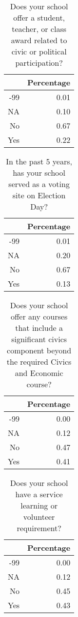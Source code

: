 \documentclass[12pt]{article}
\begin{document}
\begin{table}[ht]
\caption {Does your school offer a student, teacher, or class award related to civic or political participation?}
\centering
\begin{tabular}{rr}
  \hline
 & Percentage \\ 
  \hline
-99 & 0.01 \\ 
  NA & 0.10 \\ 
  No & 0.67 \\ 
  Yes & 0.22 \\ 
   \hline
\end{tabular}
\end{table}
\begin{table}[ht]
\caption {In the past 5 years, has your school served as a voting site on Election Day?}
\centering
\begin{tabular}{rr}
  \hline
 & Percentage \\ 
  \hline
-99 & 0.01 \\ 
  NA & 0.20 \\ 
  No & 0.67 \\ 
  Yes & 0.13 \\ 
   \hline
\end{tabular}
\end{table}

\begin{table}[ht]
\caption {Does your school offer any courses that include a significant civics component beyond the required Civics and Economic course?}
\centering
\begin{tabular}{rr}
  \hline
 & Percentage \\ 
  \hline
-99 & 0.00 \\ 
  NA & 0.12 \\ 
  No & 0.47 \\ 
  Yes & 0.41 \\ 
   \hline
\end{tabular}
\end{table}

\begin{table}[ht]
\caption {Does your school have a service learning or volunteer requirement?}
\centering
\begin{tabular}{rr}
  \hline
 & Percentage \\ 
  \hline
-99 & 0.00 \\ 
  NA & 0.12 \\ 
  No & 0.45 \\ 
  Yes & 0.43 \\ 
   \hline
\end{tabular}
\end{table}
\end{document}
